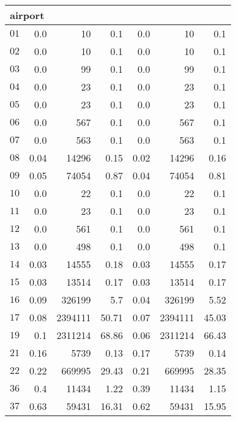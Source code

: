 \begin{longtable}{|c||r|r|r||r|r|r|}
\multicolumn{7}{|l|}{airport}\\\hline
$01$ & 0.0 & 10 & 0.1 &0.0 & 10 & 0.1 \\\hline
$02$ & 0.0 & 10 & 0.1 &0.0 & 10 & 0.1 \\\hline
$03$ & 0.0 & 99 & 0.1 &0.0 & 99 & 0.1 \\\hline
$04$ & 0.0 & 23 & 0.1 &0.0 & 23 & 0.1 \\\hline
$05$ & 0.0 & 23 & 0.1 &0.0 & 23 & 0.1 \\\hline
$06$ & 0.0 & 567 & 0.1 &0.0 & 567 & 0.1 \\\hline
$07$ & 0.0 & 563 & 0.1 &0.0 & 563 & 0.1 \\\hline
$08$ & 0.04 & 14296 & 0.15 &0.02 & 14296 & 0.16 \\\hline
$09$ & 0.05 & 74054 & 0.87 &0.04 & 74054 & 0.81 \\\hline
$10$ & 0.0 & 22 & 0.1 &0.0 & 22 & 0.1 \\\hline
$11$ & 0.0 & 23 & 0.1 &0.0 & 23 & 0.1 \\\hline
$12$ & 0.0 & 561 & 0.1 &0.0 & 561 & 0.1 \\\hline
$13$ & 0.0 & 498 & 0.1 &0.0 & 498 & 0.1 \\\hline
$14$ & 0.03 & 14555 & 0.18 &0.03 & 14555 & 0.17 \\\hline
$15$ & 0.03 & 13514 & 0.17 &0.03 & 13514 & 0.17 \\\hline
$16$ & 0.09 & 326199 & 5.7 &0.04 & 326199 & 5.52 \\\hline
$17$ & 0.08 & 2394111 & 50.71 &0.07 & 2394111 & 45.03 \\\hline
$19$ & 0.1 & 2311214 & 68.86 &0.06 & 2311214 & 66.43 \\\hline
$21$ & 0.16 & 5739 & 0.13 &0.17 & 5739 & 0.14 \\\hline
$22$ & 0.22 & 669995 & 29.43 &0.21 & 669995 & 28.35 \\\hline
$36$ & 0.4 & 11434 & 1.22 &0.39 & 11434 & 1.15 \\\hline
$37$ & 0.63 & 59431 & 16.31 &0.62 & 59431 & 15.95 \\\hline



\end{longtable}
